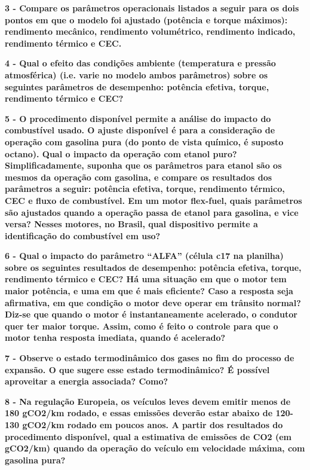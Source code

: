 \documentclass[a4paper]{article}
\begin{document}
\textbf{3 - Compare os parâmetros operacionais listados a seguir para os dois pontos em que o modelo foi ajustado (potência e torque máximos): rendimento mecânico, rendimento volumétrico, rendimento indicado, rendimento térmico e CEC.}
\vspace{2mm}

\textbf{4 - Qual o efeito das condições ambiente (temperatura e pressão atmosférica) (i.e. varie no modelo ambos parâmetros) sobre os seguintes parâmetros de desempenho: potência efetiva, torque, rendimento térmico e CEC?}
\vspace{2mm}

\textbf{5 - O procedimento disponível permite a análise do impacto do combustível usado. O ajuste disponível é para a consideração de operação com gasolina pura (do ponto de vista químico, é suposto octano). Qual o impacto da operação com etanol puro?\\ Simplificadamente, suponha que os parâmetros para etanol são os mesmos da operação com gasolina, e compare os resultados dos parâmetros a seguir: potência efetiva, torque, rendimento térmico, CEC e fluxo de combustível. Em um motor flex-fuel, quais parâmetros são ajustados quando a operação passa de etanol para gasolina, e vice versa? Nesses motores, no Brasil, qual dispositivo permite a identificação do combustível em uso?}
\vspace{2mm}

\textbf{6 - Qual o impacto do parâmetro “ALFA” (célula c17 na planilha) sobre os seguintes resultados de desempenho: potência efetiva, torque, rendimento térmico e CEC? Há uma situação em que o motor tem maior potência, e uma em que é mais eficiente? Caso a resposta seja afirmativa, em que condição o motor deve operar em trânsito normal? Diz-se que quando o motor é instantaneamente acelerado, o condutor quer ter maior torque. Assim, como é feito o controle para que o motor tenha resposta imediata, quando é acelerado?}
\vspace{2mm}

\textbf{7 - Observe o estado termodinâmico dos gases no fim do processo de expansão. O que sugere esse estado termodinâmico? É possível aproveitar a energia associada? Como?}
\vspace{2mm}

\textbf{8 - Na regulação Europeia, os veículos leves devem emitir menos de 180 gCO2/km rodado, e essas emissões deverão estar abaixo de 120-130 gCO2/km rodado em poucos anos. A partir dos resultados do procedimento disponível, qual a estimativa de emissões de CO2 (em gCO2/km) quando da operação do veículo em velocidade máxima, com gasolina pura?}
\vspace{5mm}
\end{document}
